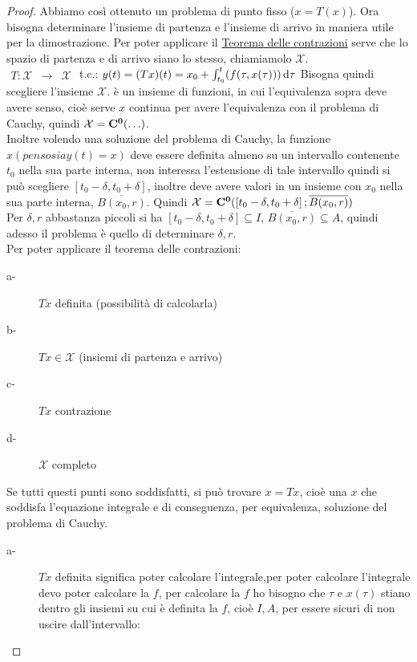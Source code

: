 \begin{proof}
	Abbiamo così ottenuto un problema di punto fisso ($x=T(x)$). Ora bisogna determinare l'insieme di partenza e l'insieme di arrivo in maniera utile per la dimostrazione. Per poter applicare il \hyperref[teo:contrazioni]{Teorema delle contrazioni} serve che lo spazio di partenza e di arrivo siano lo stesso, chiamiamolo $\mathcal{X}$.\\
	$\begin{array}{rcl} T: \mathcal{X} & \to & \mathcal{X} \end{array}$ t.c.: $y(t)=(Tx)(t)=x_0+\int_{t_0}^{t}(f(\tau,x(\tau)))\,\mathrm{d}{\tau}$
	Bisogna quindi scegliere l'insieme $\mathcal{X}$. è un insieme di funzioni, in cui l'equivalenza sopra deve avere senso, cioè serve $x$ continua per avere l'equivalenza con il problema di Cauchy, quindi $\mathcal{X}=\mathbf{C^{0}}(\ldots)$.\\
	Inoltre volendo una soluzione del problema di Cauchy, la funzione $x(penso sia y(t)=x)$ deve essere definita almeno su un intervallo contenente $t_0$ nella sua parte interna, non interessa l'estensione di tale intervallo quindi si può scegliere $\left[t_0-\delta,t_0+\delta\right]$, inoltre deve avere valori in un insieme con $x_0$ nella sua parte interna, $\overline{B(x_0,r)}$. Quindi $\mathcal{X}=\mathbf{C^{0}}(\left[t_0-\delta,t_0+\delta\right];\overline{B(x_0,r)})$\\
	Per $\delta, r$ abbastanza piccoli si ha $\left[t_0-\delta,t_0+\delta\right]\subseteq I$, $\overline{B(x_0,r)}\subseteq A$, quindi adesso il problema è quello di determinare $\delta, r$.\\
	Per poter applicare il teorema delle contrazioni:
	\begin{description}
		\item[a-] $Tx$ definita (possibilità di calcolarla)
		\item[b-] $Tx\in\mathcal{X}$ (insiemi di partenza e arrivo)
		\item[c-] $Tx$ contrazione
		\item[d-] $\mathcal{X}$ completo
	\end{description}
	Se tutti questi punti sono soddisfatti, si può trovare $x=Tx$, cioè una $x$ che soddisfa l'equazione integrale e di conseguenza, per equivalenza, soluzione del problema di Cauchy.  
	\begin{description}
		\item[a-] $Tx$ definita significa poter calcolare l'integrale,per poter calcolare l'integrale devo poter calcolare la $f$, per calcolare la $f$ ho bisogno che $\tau$ e $x(\tau)$ stiano dentro gli insiemi su cui è definita la $f$, cioè $I,A$, per essere sicuri di non uscire dall'intervallo:

\end{description}
\end{proof}
